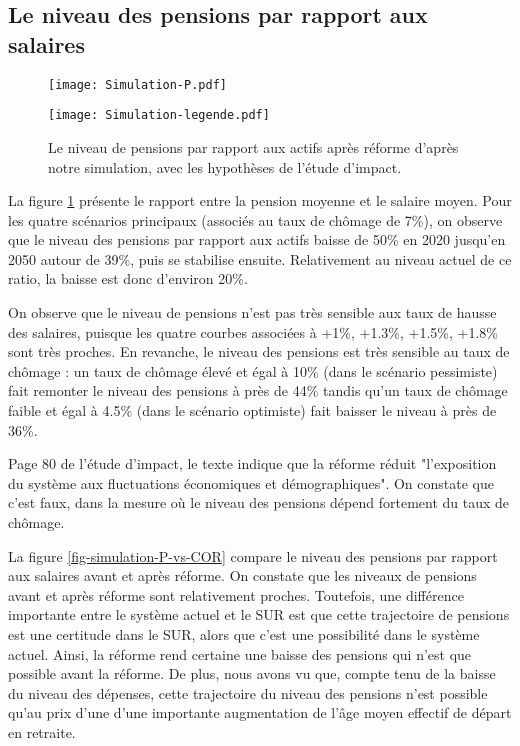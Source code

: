 \documentclass[10pt]{article}
\begin{document}
\subsection{Le niveau des pensions par rapport aux salaires}

\begin{figure}
\begin{center}
\texttt{[image: Simulation-P.pdf]}

\texttt{[image: Simulation-legende.pdf]}
\end{center}

\caption{Le niveau de pensions par rapport aux actifs après réforme 
d'après notre simulation, avec les hypothèses de l'étude d'impact.}
\label{fig-simulation-P}
\end{figure}

La figure \ref{fig-simulation-P} présente le rapport entre la pension moyenne et le salaire moyen. 
Pour les quatre scénarios principaux (associés au taux de chômage 
de 7\%), on observe que le niveau des pensions par rapport aux actifs 
baisse de 50\% en 2020 jusqu'en 2050 autour de 39\%, puis se stabilise ensuite. 
Relativement au niveau actuel de ce ratio, la baisse est donc d'environ 20\%. 

On observe que le niveau de pensions n'est pas très sensible 
aux taux de hausse des salaires, puisque les quatre courbes associées 
à +1\%, +1.3\%, +1.5\%,  +1.8\% sont très proches. 
En revanche, le niveau des pensions est très sensible au taux de chômage : 
un taux de chômage élevé et égal à 10\% (dans le scénario pessimiste) 
fait remonter le niveau des pensions à près de 44\% tandis qu'un taux de 
chômage faible et égal à 4.5\% (dans le scénario optimiste) fait baisser 
le niveau à près de 36\%. 

Page 80 de l'étude d'impact, le texte indique que la réforme 
réduit "l’exposition du système aux fluctuations économiques et démographiques". 
On constate que c'est faux, dans la mesure où le niveau des pensions 
dépend fortement du taux de chômage.

La figure \ref{fig-simulation-P-vs-COR} compare le niveau des pensions par rapport 
aux salaires avant et après réforme. 
On constate que les niveaux de pensions avant et après réforme sont 
relativement proches. 
Toutefois, une différence importante entre le système actuel 
et le SUR est que cette trajectoire de pensions est une certitude dans le SUR, 
alors que c'est une possibilité dans le système actuel. 
Ainsi, la réforme rend certaine une baisse des pensions qui n'est que 
possible avant la réforme. 
De plus, nous avons vu que, compte tenu de la baisse du niveau des dépenses, 
cette trajectoire du niveau des pensions n'est possible qu'au prix d'une 
d'une importante augmentation de l'âge moyen effectif de départ en retraite. 
\end{document}
